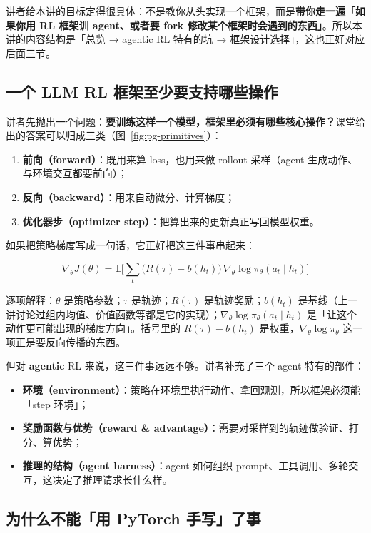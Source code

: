 \documentclass[a4paper]{article}
\begin{document}
讲者给本讲的目标定得很具体：不是教你从头实现一个框架，而是\textbf{带你走一遍「如果你用 RL 框架训 agent、或者要 fork 修改某个框架时会遇到的东西」}。所以本讲的内容结构是「总览 → agentic RL 特有的坑 → 框架设计选择」，这也正好对应后面三节。

\subsection{一个 LLM RL 框架至少要支持哪些操作}

讲者先抛出一个问题：\textbf{要训练这样一个模型，框架里必须有哪些核心操作？}课堂给出的答案可以归成三类（图~\ref{fig:pg-primitives}）：

\begin{enumerate}
\item \textbf{前向（forward）}：既用来算 loss，也用来做 rollout 采样（agent 生成动作、与环境交互都要前向）；
\item \textbf{反向（backward）}：用来自动微分、计算梯度；
\item \textbf{优化器步（optimizer step）}：把算出来的更新真正写回模型权重。
\end{enumerate}

如果把策略梯度写成一句话，它正好把这三件事串起来：

$$\nabla_\theta J(\theta) = \mathbb{E}\Big[\sum_{t}\big(R(\tau)-b(h_t)\big)\,\nabla_\theta \log \pi_\theta(a_t \mid h_t)\Big]$$

逐项解释：$\theta$ 是策略参数；$\tau$ 是轨迹；$R(\tau)$ 是轨迹奖励；$b(h_t)$ 是基线（上一讲讨论过组内均值、价值函数等都是它的实现）；$\nabla_\theta \log \pi_\theta(a_t\mid h_t)$ 是「让这个动作更可能出现的梯度方向」。括号里的 $R(\tau)-b(h_t)$ 是权重，$\nabla_\theta\log\pi_\theta$ 这一项正是要反向传播的东西。

但对 \textbf{agentic} RL 来说，这三件事远远不够。讲者补充了三个 agent 特有的部件：

\begin{itemize}
\item \textbf{环境（environment）}：策略在环境里执行动作、拿回观测，所以框架必须能「step 环境」；
\item \textbf{奖励函数与优势（reward \& advantage）}：需要对采样到的轨迹做验证、打分、算优势；
\item \textbf{推理的结构（agent harness）}：agent 如何组织 prompt、工具调用、多轮交互，这决定了推理请求长什么样。
\end{itemize}

\subsection{为什么不能「用 PyTorch 手写」了事}
\end{document}
